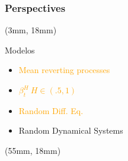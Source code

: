 \begin{frame}[plain]
    \frametitle{}
\end{frame}
\begin{frame}
    \frametitle{Perspectives}
        \begin{textblock*}{50mm}(3mm, 18mm)
            \begin{bluebox}{Modelos}
                \begin{itemize}
                        \item
                            \textcolor<1>{orange}{
                                Mean reverting processes
                            }
                        \item
                            \textcolor<2>{orange}{
                                $
                                    \beta_t^H \ H \in (\num{.5}, 1)
                                $
                            }
                        \item
                            \textcolor<3>{orange}{
                                Random Diff. Eq.
                            }
                        \item
                            Random Dynamical Systems
                \end{itemize}
            \end{bluebox}
        \end{textblock*}
        \begin{textblock*}{72mm}(55mm, 18mm)
           \begin{graybox}{
            }%

\end{graybox}
\end{textblock*}
\end{frame}

